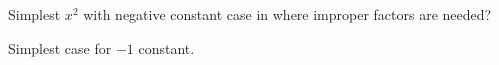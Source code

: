 \documentclass[12pt, a4paper, addpoints]{exam}
\begin{document}
\begin{questions}
\question Simplest  $x^2$ with negative constant case in where improper factors are needed? 
\setlength{\columnsep}{20pt}
\begin{multicols}{3}
\end{multicols}


\question  Simplest case for $-1$ constant. 
\setlength{\columnsep}{20pt}
\begin{multicols}{3}
\end{multicols}
\newpage



\end{questions}
\end{document}

